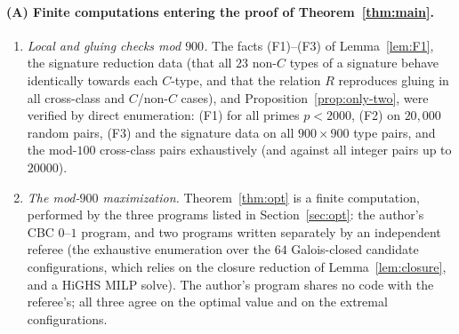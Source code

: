 \documentclass[11pt,a4paper]{article}
\theoremstyle{plain}
\theoremstyle{definition}
\theoremstyle{remark}
\begin{document}
\paragraph{(A) Finite computations entering the proof of Theorem~\ref{thm:main}.}
\begin{enumerate}
\item \emph{Local and gluing checks mod $900$.} The facts (F1)--(F3) of Lemma~\ref{lem:F1}, the
signature reduction data (that all $23$ non-$C$ types of a signature behave identically towards each
$C$-type, and that the relation $R$ reproduces gluing in all cross-class and $C$/non-$C$ cases), and
Proposition~\ref{prop:only-two}, were verified by direct enumeration: (F1) for all primes $p<2000$,
(F2) on $20{,}000$ random pairs, (F3) and the signature data on all $900\times 900$ type pairs, and
the mod-$100$ cross-class pairs exhaustively (and against all integer pairs up to $20000$).
\item \emph{The mod-$900$ maximization.} Theorem~\ref{thm:opt} is a finite computation, performed by
the three programs listed in Section~\ref{sec:opt}: the author's CBC $0$--$1$ program, and two
programs written separately by an independent referee (the exhaustive enumeration over the $64$
Galois-closed candidate configurations, which relies on the closure reduction of
Lemma~\ref{lem:closure}, and a HiGHS MILP solve). The author's program shares no code with the
referee's; all three agree on the optimal value and on the extremal configurations.
\end{enumerate}
\end{document}
